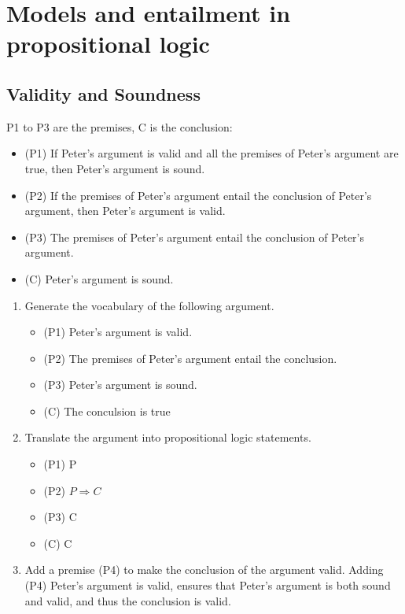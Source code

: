 \section{Models and entailment in propositional logic}
\subsection{Validity and Soundness}
\begin{large}
  P1 to P3 are the premises, C is the conclusion:
  \begin{itemize}
    \item (P1) If Peter’s argument is valid and all the premises of Peter’s argument are true, then Peter’s argument is sound.
    \item (P2) If the premises of Peter’s argument entail the conclusion of Peter’s argument, then Peter’s
          argument is valid.
    \item (P3) The premises of Peter’s argument entail the conclusion of Peter’s argument.
    \item (C) Peter’s argument is sound.
  \end{itemize}

  \begin{enumerate}[label=(\alph*)]
    \item Generate the vocabulary of the following argument.
          \begin{itemize}
            \item (P1) Peter's argument is valid.
            \item (P2) The premises of Peter's argument entail the conclusion.
            \item (P3) Peter's argument is sound.
            \item (C) The conculsion is true
          \end{itemize}
    \item Translate the argument into propositional logic statements.
          \begin{itemize}
            \item (P1) P
            \item (P2) $ P \Rightarrow C $
            \item (P3) C
            \item (C) C
          \end{itemize}
    \item Add a premise (P4) to make the conclusion of the argument valid.
          Adding (P4) Peter's argument is valid, ensures that Peter's argument is both sound and valid, and thus the conclusion is valid.
  \end{enumerate}
\end{large}



